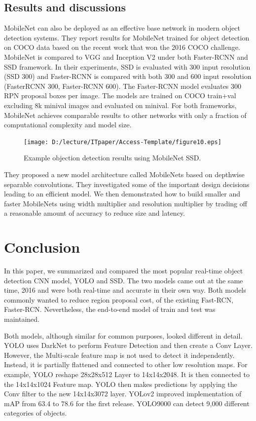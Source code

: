 \documentclass{ieeeaccess}
\begin{document}
\subsection{Results and discussions}

MobileNet can also be deployed as an effective base network in modern object detection systems. They report results for MobileNet trained for object detection on COCO data based on the recent work that won the 2016 COCO challenge.  MobileNet is compared to VGG and Inception V2 under both Faster-RCNN and SSD framework. In their experiments, SSD is evaluated with 300 input resolution (SSD 300) and Faster-RCNN is compared with both 300 and 600 input resolution (FasterRCNN 300, Faster-RCNN 600). The Faster-RCNN model evaluates 300 RPN proposal boxes per image. The models are trained on COCO train+val excluding 8k minival images and evaluated on minival. For both frameworks, MobileNet achieves comparable results to other networks with only a fraction of computational complexity and model size.

\begin{figure}
	\centering
		\texttt{[image: D:/lecture/ITpaper/Access-Template/figure10.eps]}
	\caption { Example objection detection results using MobileNet SSD.}
	\label{fig:figure10}
\end{figure}

They proposed a new model architecture called MobileNets based on depthwise separable convolutions. They investigated some of the important design decisions leading
to an efficient model. We then demonstrated how to build smaller and faster MobileNets using width multiplier and resolution multiplier by trading off a reasonable amount of accuracy to reduce size and latency.


\section{Conclusion}

In this paper, we summarized and compared the most popular real-time object detection CNN model, YOLO and SSD. The two models came out at the same time, 2016 and were both real-time and accurate in their own way. Both models commonly wanted to reduce region proposal cost, of the existing Fast-RCN, Faster-RCN. Nevertheless, the end-to-end model of train and test was maintained.

Both models, although similar for common purposes, looked different in detail. YOLO uses DarkNet to perform Feature Detection and then create a Conv Layer. However, the Multi-scale feature map is not used to detect it independently. Instead, it is partially flattened and connected to other low resolution maps. For example, YOLO reshape 28x28x512 Layer to 14x14x2048. It is then connected to the 14x14x1024 Feature map. YOLO then makes predictions by applying the Conv filter to the new 14x14x3072 layer. YOLov2 improved implementation of mAP from 63.4 to 78.6 for the first release. YOLO9000 can detect 9,000 different categories of objects.
\end{document}
